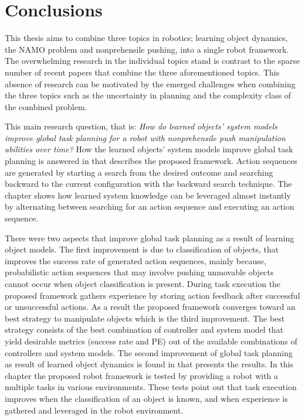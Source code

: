 \chapter{Conclusions}%
\label{chap:conclusion}
This thesis aims to combine three topics in robotics; learning object dynamics, the \ac{NAMO} problem and nonprehensile pushing, into a single robot framework. The overwhelming research in the individual topics stand is contrast to the sparse number of recent papers that combine the three aforementioned topics. This absence of research can be motivated by the emerged challenges when combining the three topics such as the uncertainty in planning and the complexity class of the combined problem.\bs

This main research question, that is: \textit{How do learned objects' system models improve global task planning for a robot with nonprehensile push manipulation abilities over time?} How the learned objects' system models improve global task planning is answered in  that describes the proposed framework. Action sequences are generated by starting a search from the desired outcome and searching backward to the current configuration with the backward search technique. The chapter shows how learned system knowledge can be leveraged almost instantly by alternating between searching for an action sequence and executing an action sequence.\bs

There were two aspects that improve global task planning as a result of learning object models. The first improvement is due to classification of objects, that improves the success rate of generated action sequences, mainly because, probabilistic action sequences that may involve pushing unmovable objects cannot occur when object classification is present. During task execution the proposed framework gathers experience by storing action feedback after successful or unsuccessful actions. As a result the proposed framework converges toward an best strategy to manipulate objects which is the third improvement. The best strategy consists of the best combination of controller and system model that yield desirable metrics (success rate and \acl{PE}) out of the available combinations of controllers and system models. The second improvement of global task planning as result of learned object dynamics is found in  that presents the results. In this chapter the proposed robot framework is tested by providing a robot with a multiple tasks in various environments. These tests point out that task execution improves when the classification of an object is known, and when experience is gathered and leveraged in the robot environment.\bs

